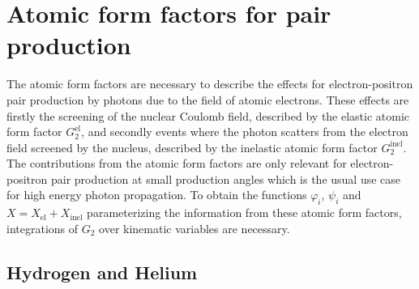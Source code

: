 \chapter{Atomic form factors for pair production}
\label{sec:atomic_form_factors}

The atomic form factors are necessary to describe the effects for electron-positron pair production by photons due to the field of atomic electrons.
These effects are firstly the screening of the nuclear Coulomb field, described by the elastic atomic form factor $G_2^{\text{el}}$, and secondly events where the photon scatters from the electron field screened by the nucleus, described by the inelastic atomic form factor $G_2^{\text{inel}}$.
The contributions from the atomic form factors are only relevant for electron-positron pair production at small production angles which is the usual use case for high energy photon propagation.
To obtain the functions $\varphi_i$, $\psi_i$ and $X = X_{\text{el}} + X_{\text{inel}}$ parameterizing the information from these atomic form factors, integrations of $G_2$ over kinematic variables are necessary.

\section{Hydrogen and Helium}

